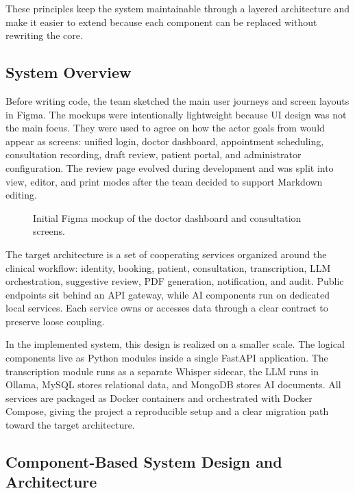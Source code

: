 These principles keep the system maintainable through a layered architecture and make it easier to extend because each component can be replaced without rewriting the core.

\subsection{System Overview}
\label{subsec:system-overview}

Before writing code, the team sketched the main user journeys and screen layouts in Figma. The mockups were intentionally lightweight because UI design was not the main focus. They were used to agree on how the actor goals from  would appear as screens: unified login, doctor dashboard, appointment scheduling, consultation recording, draft review, patient portal, and administrator configuration. The review page evolved during development and was split into view, editor, and print modes after the team decided to support Markdown editing.

\begin{figure}[htbp]
\centering
{}
\caption{Initial Figma mockup of the doctor dashboard and consultation screens.}
\label{fig:figma-mockup}
\end{figure}
\FloatBarrier

The target architecture is a set of cooperating services organized around the clinical workflow: identity, booking, patient, consultation, transcription, LLM orchestration, suggestive review, PDF generation, notification, and audit. Public endpoints sit behind an API gateway, while AI components run on dedicated local services. Each service owns or accesses data through a clear contract to preserve loose coupling.

In the implemented system, this design is realized on a smaller scale. The logical components live as Python modules inside a single FastAPI application. The transcription module runs as a separate Whisper sidecar, the LLM runs in Ollama, MySQL stores relational data, and MongoDB stores AI documents. All services are packaged as Docker containers and orchestrated with Docker Compose, giving the project a reproducible setup and a clear migration path toward the target architecture.

\subsection{Component-Based System Design and Architecture}
\label{subsec:component-based-design}

